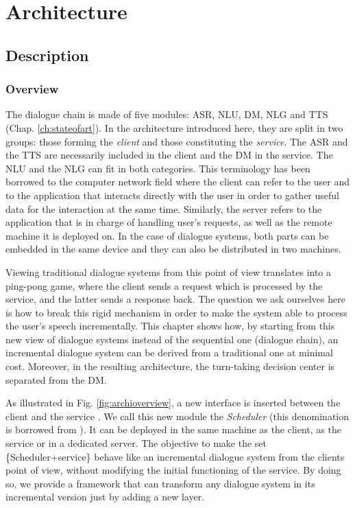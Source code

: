\chapter{Architecture}

\label{ch:architecture}

\section{Description}
	\subsection{Overview}
    
    	The dialogue chain is made of five modules: ASR, NLU, DM, NLG and TTS (Chap. \ref{ch:stateofart}). In the architecture introduced here, they are split in two groups: those forming the \textit{client} and those constituting the \textit{service}. The ASR and the TTS are necessarily included in the client and the  DM in the service. The NLU and the NLG can fit in both categories. This terminology has been borrowed to the computer network field where the client can refer to the user and to the application that interacts directly with the user in order to gather useful data for the interaction at the same time. Similarly, the server refers to the application that is in charge of handling user's requests, as well as the remote machine it is deployed on. In the case of dialogue systems, both parts can be embedded in the same device and they can also be distributed in two machines.
        
        Viewing traditional dialogue systems from this point of view translates into a ping-pong game, where the client sends a request which is processed by the service, and the latter sends a response back. The question we ask ourselves here is how to break this rigid mechanism in order to make the system able to process the user's speech incrementally. This chapter shows how, by starting from this new view of dialogue systems instead of the sequential one (dialogue chain), an incremental dialogue system can be derived from a traditional one at minimal cost. Moreover, in the resulting architecture, the turn-taking decision center is separated from the DM.
        
        As illustrated in Fig. \ref{fig:archioverview}, a new interface is inserted between the client and the service \cite{Khouzaimi2014a}. We call this new module the \textit{Scheduler} (this denomination is borrowed from \cite{Laroche2010}). It can be deployed in the same machine as the client, as the service or in a dedicated server. The objective to make the set \{Scheduler+service\} behave like an incremental dialogue system from the clients point of view, without modifying the initial functioning of the service. By doing so, we provide a framework that can transform any dialogue system in its incremental version just by adding a new layer.
        
